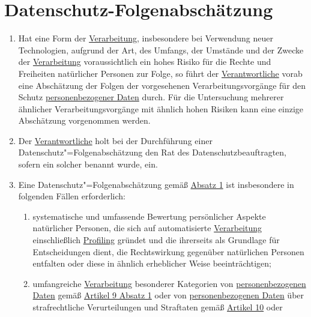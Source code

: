 \chapter{Datenschutz-Folgenabschätzung}
\label{ch:35}


\begin{enumerate}

  \item Hat eine Form der \hyperref[itm:04-2]{Verarbeitung}, insbesondere bei Verwendung neuer Technologien, aufgrund
   der Art, des Umfangs, der Umstände und der Zwecke der \hyperref[itm:04-2]{Verarbeitung} voraussichtlich ein hohes
   Risiko für die Rechte und Freiheiten natürlicher Personen zur Folge, so führt der \hyperref[itm:04-7]
   {Verantwortliche} vorab eine Abschätzung der Folgen der vorgesehenen Verarbeitungsvorgänge für den Schutz \hyperref
   [itm:04-1]{personenbezogener Daten} durch. Für die Untersuchung mehrerer ähnlicher Verarbeitungsvorgänge mit ähnlich
   hohen Risiken kann eine einzige Abschätzung vorgenommen werden.%
  \label{itm:35-1}

  \item Der \hyperref[itm:04-7]{Verantwortliche} holt bei der Durchführung einer Datenschutz"=Folgenabschätzung den Rat
   des Datenschutzbeauftragten, sofern ein solcher benannt wurde, ein.%
  \label{itm:35-2}

  \item Eine Datenschutz"=Folgenabschätzung gemäß \hyperref[itm:35-1]{Absatz 1} ist insbesondere in folgenden Fällen
   erforderlich:%
  \label{itm:35-3}

  \begin{enumerate}
  
    \item systematische und umfassende Bewertung persönlicher Aspekte natürlicher Personen, die sich auf automatisierte
     \hyperref[itm:04-2]{Verarbeitung} einschließlich \hyperref[itm:04-4]{Profiling} gründet und die ihrerseits als
      Grundlage für Entscheidungen dient, die Rechtswirkung gegenüber natürlichen Personen entfalten oder diese in
      ähnlich erheblicher Weise beeinträchtigen;%
    \label{itm:35-3a}

    \item umfangreiche \hyperref[itm:04-2]{Verarbeitung} besonderer Kategorien von \hyperref[itm:04-1]
     {personenbezogenen Daten} gemäß \hyperref[itm:09-1]{Artikel 9 Absatz 1} oder von \hyperref[itm:04-1]
     {personenbezogenen Daten} über strafrechtliche Verurteilungen und Straftaten gemäß \hyperref[ch:10]{Artikel 10}
     oder%
    \label{itm:35-3b}


\end{enumerate}
\end{enumerate}

